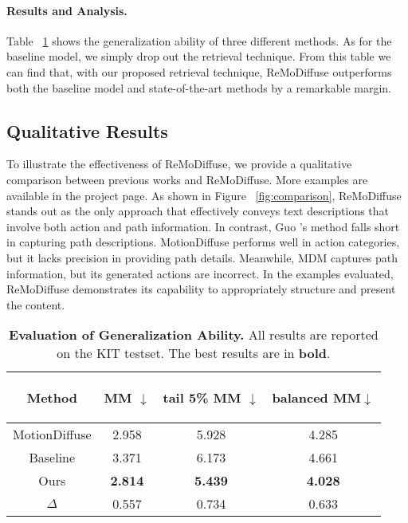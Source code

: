 \documentclass[10pt,twocolumn,letterpaper]{article}
\newcommand{\name}{ReMoDiffuse\xspace}
\begin{document}
\paragraph{Results and Analysis.} Table ~\ref{tab:few_shot} shows the generalization ability of three different methods. As for the baseline model, we simply drop out the retrieval technique. From this table we can find that, with our proposed retrieval technique, \name outperforms both the baseline model and state-of-the-art methods by a remarkable margin. 



\subsection{Qualitative Results}
\label{sec:qualitative}
To illustrate the effectiveness of \name, we provide a qualitative comparison between previous works and \name. More examples are available in the project page. As shown in Figure ~\ref{fig:comparison}, \name stands out as the only approach that effectively conveys text descriptions that involve both action and path information. In contrast, Guo \etal's method falls short in capturing path descriptions. MotionDiffuse performs well in action categories, but it lacks precision in providing path details. Meanwhile, MDM captures path information, but its generated actions are incorrect. In the examples evaluated, \name demonstrates its capability to appropriately structure and present the content.



\begin{table}[t]
\centering
\small
\caption{\textbf{Evaluation of Generalization Ability.} All results are reported on the KIT testset. The best results are in \textbf{bold}.}
\label{tab:few_shot}
\setlength{\tabcolsep}{1.4mm}
{
\begin{tabular}{cccc}
\hline\textbf{}

Method & MM $\downarrow$ & tail 5\% MM $\downarrow$ & balanced MM$\downarrow$ \\
\hline
MotionDiffuse & 2.958 & 5.928 & 4.285 \\
\hline
Baseline & 3.371 & 6.173 & 4.661 \\
Ours & \textbf{2.814} & \textbf{5.439} & \textbf{4.028} \\
$\Delta$ & 0.557 & 0.734 & 0.633 \\
\hline
\end{tabular}}
\vspace{-10pt}
\end{table}
\end{document}
